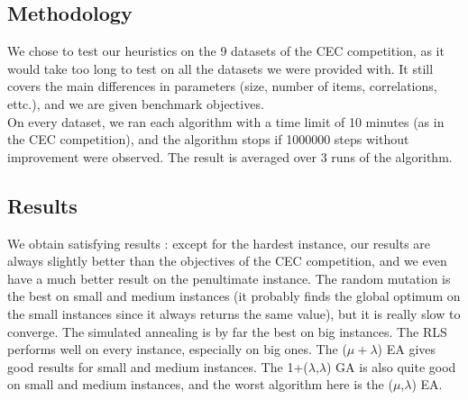 \documentclass[a4paper]{article}
\begin{document}
\subsection{Methodology}
We chose to test our heuristics on the 9 datasets of the CEC competition, as it would take too long to test on all the datasets we were provided with. It still covers the main differences in parameters (size, number of items, correlations, ettc.), and we are given benchmark objectives. \\
On every dataset, we ran each algorithm with a time limit of 10 minutes (as in the CEC competition), and the algorithm stops if 1000000 steps without improvement  were observed. The result is averaged over 3 runs of the algorithm.
\subsection{Results}
We obtain satisfying results : except for the hardest instance, our results are always slightly better than the objectives of the CEC competition, and we even have a much better result on the penultimate instance. The random mutation is the best on small and medium instances (it probably finds the global optimum on the small instances since it always returns the same value), but it is really slow to converge. The simulated annealing is by far the best on big instances. The RLS performs well on every instance, especially on big ones. The ($\mu + \lambda$) EA gives good results for small and medium instances. The 1+($\lambda$,$\lambda$) GA is also quite good on small and medium instances, and the worst algorithm here is the ($\mu$,$\lambda$) EA.

\begin{center}
\end{center}

\begin{center}
\end{center}

\begin{center}
\end{center}
\end{document}
